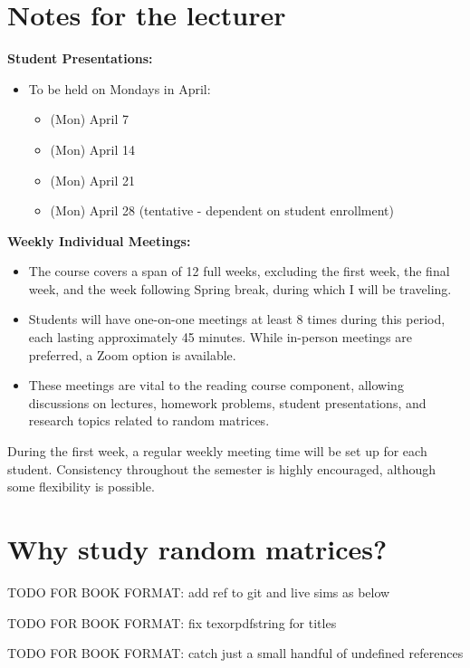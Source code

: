 \documentclass[letterpaper,11pt,oneside,reqno]{book}
\numberwithin{equation}{chapter}  %
\theoremstyle{definition}
\newenvironment{lnotes}{\section*{Notes for the lecturer}}{}
\begin{document}
\begin{lnotes}
\textbf{Student Presentations:}
\begin{itemize}
				\item To be held on Mondays in April:
				\begin{itemize}
								\item (Mon) April 7
								\item (Mon) April 14
								\item (Mon) April 21
								\item (Mon) April 28 (tentative - dependent on student enrollment)
				\end{itemize}
\end{itemize}

\textbf{Weekly Individual Meetings:}
\begin{itemize}
				\item The course covers a span of 12 full weeks, excluding the first week, the final week, and the week following Spring break, during which I will be traveling.
				\item Students will have one-on-one meetings at least 8 times during this period, each lasting approximately 45 minutes. While in-person meetings are preferred, a Zoom option is available.
				\item These meetings are vital to the reading course component, allowing discussions on lectures, homework problems, student presentations, and research topics related to random matrices.
\end{itemize}
During the first week, a regular weekly meeting time will be set up for each student. Consistency throughout the semester is highly encouraged, although some flexibility is possible.
\end{lnotes}


\section{Why study random matrices?}

TODO FOR BOOK FORMAT: add ref to git and live sims as below

TODO FOR BOOK FORMAT: fix texorpdfstring for titles

TODO FOR BOOK FORMAT: catch just a small handful of undefined references
\end{document}
